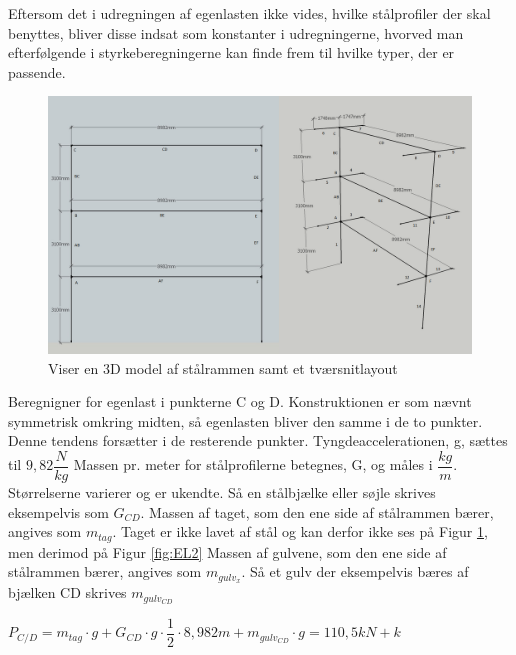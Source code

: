 Eftersom det i udregningen af egenlasten ikke vides, hvilke stålprofiler der skal benyttes, bliver disse indsat som konstanter i udregningerne, hvorved man efterfølgende i styrkeberegningerne kan finde frem til hvilke typer, der er passende.

\begin{figure}[H] 
	\centering
	\includegraphics[width=1\textwidth]{billeder/Staaldimensioner_6}
	\caption{Viser en 3D model af stålrammen samt et tværsnitlayout}
	\label{fig:EL3}
\end{figure}

Beregnigner for egenlast i punkterne C og D. Konstruktionen er som nævnt symmetrisk omkring midten, så egenlasten bliver den samme i de to punkter. Denne tendens forsætter i de resterende punkter.
\newline
Tyngdeaccelerationen, g, sættes til $ 9,82\dfrac{N}{kg} $
\newline
Massen pr. meter for stålprofilerne betegnes, G, og måles i $ \dfrac{kg}{m} $. Størrelserne varierer og er ukendte. Så en stålbjælke eller søjle skrives eksempelvis som $ G_{CD} $.
\newline
Massen af taget, som den ene side af stålrammen bærer, angives som  $ m_{tag} $. Taget er ikke lavet af stål og kan derfor ikke ses på Figur \ref{fig:EL3}, men derimod på Figur \ref{fig:EL2}
\newline
Massen af gulvene, som den ene side af stålrammen bærer, angives som $ m_{gulv_{x}} $. Så et gulv der eksempelvis bæres af bjælken CD skrives $ m_{gulv_{CD}} $
\newline
\begin{center}
	$ P_{C/D}=m_{tag}\cdot g+G_{CD}\cdot g\cdot \dfrac{1}{2}\cdot 8,982m+m_{gulv_{CD}}\cdot g =110,5kN+k$
\end{center}

